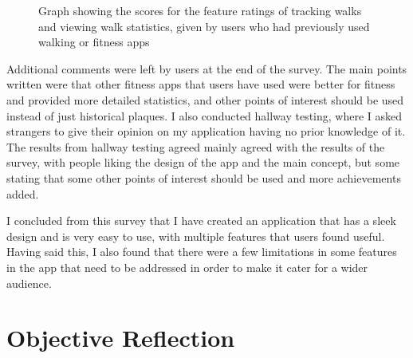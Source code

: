 \begin{figure}[htb]
    \centering
    \caption{Graph showing the scores for the feature ratings of tracking walks and viewing walk statistics, given by users who had previously used walking or fitness apps}
    \label{fig:survey-graph}
\end{figure}

Additional comments were left by users at the end of the survey. The main points written were that other fitness apps that users have used were better for fitness and provided more detailed statistics, and other points of interest should be used instead of just historical plaques. I also conducted hallway testing, where I asked strangers to give their opinion on my application having no prior knowledge of it. The results from hallway testing agreed mainly agreed with the results of the survey, with people liking the design of the app and the main concept, but some stating that some other points of interest should be used and more achievements added.

I concluded from this survey that I have created an application that has a sleek design and is very easy to use, with multiple features that users found useful. Having said this, I also found that there were a few limitations in some features in the app that need to be addressed in order to make it cater for a wider audience.

\section{Objective Reflection}

